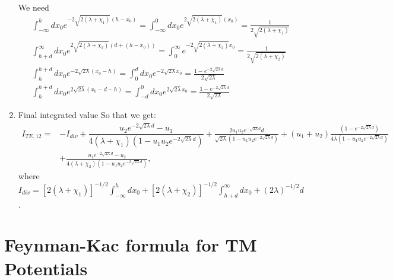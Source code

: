 \begin{enumerate}
     We need 
    \begin{gather}
      \int_{-\infty}^h dx_0 e^{-2\sqrt{2(\lambda+\chi_1)}(h-x_0)} = \int_{-\infty}^0 dx_0 e^{2\sqrt{2(\lambda+\chi_1)}(x_0)} = \frac{1}{2\sqrt{2(\lambda+\chi_1)}}\\
      \int_{h+d}^\infty dx_0 e^{2\sqrt{2(\lambda+\chi_2)}(d+(h-x_0))} = \int_0^\infty e^{-2\sqrt{2(\lambda+\chi_2)}x_0} = \frac{1}{2\sqrt{2(\lambda+\chi_2)}}\\
      \int_{h}^{h+d} dx_0 e^{-2\sqrt{2\lambda}(x_0-h)} = \int_0^d  dx_0 e^{-2\sqrt{2\lambda}x_0} = \frac{1 - e^{-2\sqrt{2\lambda}d}}{2\sqrt{2\lambda}}\\
      \int_{h}^{h+d} dx_0 e^{2\sqrt{2\lambda}(x_0-d-h)} = \int_{-d}^0  dx_0 e^{2\sqrt{2\lambda}x_0} = \frac{1 - e^{-2\sqrt{2\lambda}d}}{2\sqrt{2\lambda}}
    \end{gather}
   \item Final integrated value
    So that we get:
    \begin{align}
      I_{TE,12} =& -I_{div} + \dfrac{u_2 e^{-2\sqrt{2\lambda}d}-u_1}{4(\lambda+\chi_1)(1-u_1u_2 e^{-2\sqrt{2\lambda}d})} +\frac{2u_1u_2 e^{-\sqrt{2\lambda}d}d}{\sqrt{2\lambda}(1-u_1u_2 e^{-2\sqrt{2\lambda}d})} + (u_1+u_2)\frac{(1-e^{-2\sqrt{2\lambda}d})}{4\lambda(1-u_1u_2e^{-2\sqrt{2\lambda}d})}\nonumber\\
      & +\frac{u_1 e^{-2\sqrt{2\lambda}d} - u_2}{4(\lambda+\chi_2)(1-u_1u_2 e^{-2\sqrt{2\lambda}d})},
    \end{align}
    where $I_{div} = [2(\lambda+\chi_1)]^{-1/2}\int_{-\infty}^h dx_0  +  [2(\lambda+\chi_2)]^{-1/2}\int_{h+d}^\infty dx_0  + (2\lambda)^{-1/2}d$.
\end{enumerate}

\section{Feynman-Kac formula for TM Potentials}

